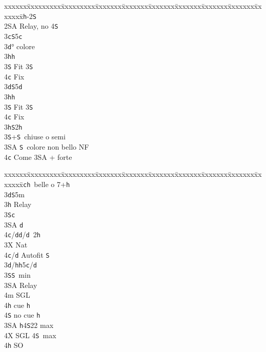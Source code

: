\documentclass[a4paper,italian]{article}
\newcommand{\BS}{\small{\texttt{S}}}
\newcommand{\BC}{\small{\texttt{c}}}
\newcommand{\BD}{\small{\texttt{d}}}
\newcommand{\BH}{\small{\texttt{h}}}
\newenvironment{bidtable}
{\begin{tabbing}

    xxxxxx\=xxxxxxxxx\=xxxxxxxxx\=xxxxxxx\=xxxxxxx\=xxxxxxx\=xxxxxxx\=xxxxxxx\=xxxxxxx\=xxxxxxx\=\kill}
{\end{tabbing} }%
\begin{document}
\begin{multicols}{2}
    \begin{bidtable}
        1\BH-2\BS\+\\
        2\small{SA} \> Relay, no 4\BS \+\\
        3\BC {}\BS 5\BC \+\\
        3\BD {}° colore\\
        3\BH {}\BH \\
        3\BS \> Fit 3\BS \\
        4\BC \> Fix\-\\
        3\BD {}\BS 5\BD \+\\
        3\BH {}\BH \\
        3\BS \> Fit 3\BS \\
        4\BC \> Fix\-\\
        3\BH {}\BS 2\BH \\
        3\BS {}+\BS\ chiuse o semi\\
        3\small{SA} \BS\ colore non bello NF\\
        4\BC \> Come 3\small{SA} + forte\\
    \end{bidtable}
    \columnbreak
    \begin{bidtable}
        3\BC {}\BH\ belle o 7+\BH \+\\
        3\BD {}\BS 5m\+\\
        3\BH \> Relay\+\\
        3\BS {}\BC \\
        3\small{SA} \BD \\
        4\BC/\BD {}\BD /\BD\ 2\BH \-\-\\
        3X \> Nat\\
        4\BC/\BD \> Autofit \BS \-\\
        3\BD/\BH {}\BH 5\BC /\BD \\
        3\BS {}\BS\ min\+\\
        3\small{SA} \> Relay\+\\
        4m \> SGL\\
        4\BH {} cue \BH \\
        4\BS {} no cue \BH \-\-\\
        3\small{SA} \BH 4\BS 22 max\\
        4X \> SGL 4\BS\ max\\
        4\BH \> SO
    \end{bidtable}
\end{multicols}
\end{document}
